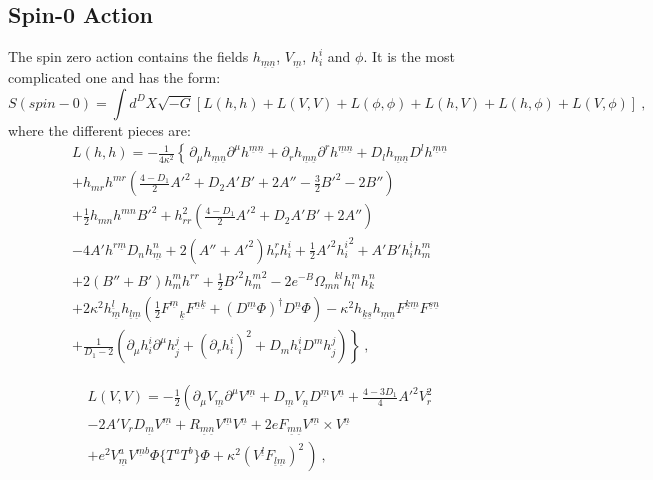 \documentclass[a4paper,12pt]{article}
\begin{document}
\subsection{Spin-0 Action}
The spin zero action contains the fields
$h_{\underline m \underline n}$, $V_{\underline m}$, $h^i_i$ and
$\phi$.
It is the most complicated one and has the form:
\begin{equation}
S(spin-0)= \int d^D X \sqrt{-G}\left[L(h,h) + L(V,V) + L(\phi,\phi)
+ L(h,V) + L(h,\phi) +L(V,\phi)\right]~,
\label{spin0}
\end{equation}
where the different pieces are:
\begin{eqnarray}
L(h,h)=-\frac{1}{4\kappa^2}\left\{\frac{}{}
\partial_\mu h_{\underline m \underline n}
\partial^\mu h^{\underline m \underline n}
+\partial_r h_{\underline m \underline n}
\partial^r h^{\underline m \underline n}
+D_l h_{\underline m \underline n}
D^l h^{\underline m \underline n}\right.
\nonumber
\\
+h_{mr}h^{mr}\left(\frac{4-D_1}{2}{A'}^2 +D_2 A' B' + 2 A''
-\frac{3}{2}{B'}^2-2B''\right)
\nonumber
\\
\nonumber
+\frac{1}{2}h_{mn}h^{mn}{B'}^2
+h_{rr}^2\left(\frac{4-D_1}{2}{A'}^2+D_2 A' B'+ 2 A''\right)
\\
-4A'h^{r\underline m}D_n h^n_{\underline m} +
2(A''+{A'}^2){h_r^r}h_i^i + \frac{1}{2} {A'}^2 {h_i^i}^2 +
A'B'h_i^i h_m^m\\
+2(B''+B')h_m^m h^{rr}
+ \frac{1}{2} {B'}^2{h_m^m}^2 - 2
e^{-B}\Omega_{mn}^{\quad kl} h^m_l h^n_k \nonumber
\\
+ 2\kappa^2 h_{\underline m}^{\underline l}h_{\underline l \underline
m} \left(\frac{1}{2}F^{\underline m}_{\quad \underline k}
F^{\underline n \underline k}+(D^{\underline m}\Phi)^\dagger
D^{\underline n}\Phi\right)
-\kappa^2h_{\underline k \underline s}h_{\underline m \underline n}
F^{\underline k \underline m} F^{\underline s \underline n}
\nonumber
\\
\left.
+\frac{1}{D_1-2}\left(\partial_\mu h_i^i\partial^\mu h_j^j
+(\partial_r h_i^i)^2 + D_m h_i^iD^m h_j^j\right)\right\}~,
\nonumber
\end{eqnarray}

\begin{eqnarray}
L(V,V)=-\frac{1}{2}\left(
\partial_\mu V_{\underline m}\partial^\mu V^{\underline m}
+ D_{\underline m}V_{\underline n}D^{\underline m}V^{\underline n}
+\frac{4-3D_1}{4}{A'}^2V_r^2 \right.
\nonumber
\\
- 2 A' V_r D_{\underline m}V^{\underline m}
+R_{\underline m \underline n}V^{\underline m}V^{\underline n}
+2eF_{\underline m \underline n}V^{\underline m}\times V^{\underline
n}
\\
\nonumber
\left.
+e^2 V_{\underline m}^aV^{\underline m b}\Phi\{T^a T^b\}\Phi
+\kappa^2(V^{\underline l}F_{\underline l \underline m})^2\frac{}{}
\right)~,
\end{eqnarray}
\end{document}
